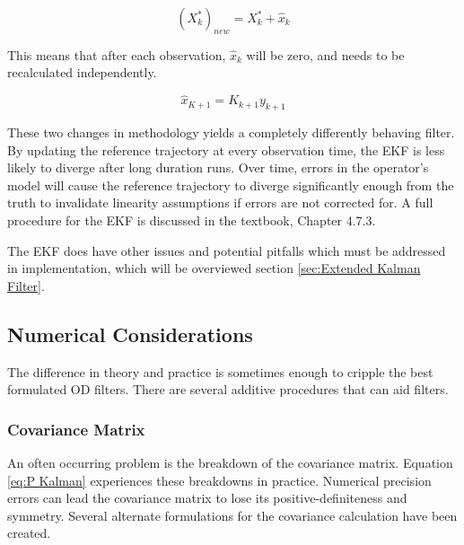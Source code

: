 \documentclass[12pt,a4paper,oneside]{article}
\numberwithin{equation}{section}   		%
\begin{document}
\begin{equation}
	(X_k^*)_{new} = X^*_k + \hat{x}_k
	\label{eq:Xk EKF}
\end{equation}

This means that after each observation, $\hat{x}_k$ will be zero, and needs to be recalculated independently. 

\begin{equation}
	\hat{x}_{K+1} = K_{k+1}y_{k+1}
	\label{eq:xk EKF}
\end{equation}

These two changes in methodology yields a completely differently behaving filter. By updating the reference trajectory at every observation time, the EKF is less likely to diverge after long duration runs. Over time, errors in the operator's model will cause the reference trajectory to diverge significantly enough from the truth to invalidate linearity assumptions if errors are not corrected for. A full procedure for the EKF is discussed in the textbook, Chapter 4.7.3. 

The EKF does have other issues and potential pitfalls which must be addressed in implementation, which will be overviewed section \ref{sec:Extended Kalman Filter}. 






\subsection{Numerical Considerations} 
\label{sec:Numerical Considerations}

The difference in theory and practice is sometimes enough to cripple the best formulated OD filters. There are several additive procedures that can aid filters.



\subsubsection{Covariance Matrix}
\label{sec:Cov Mat}
An often occurring problem is the breakdown of the covariance matrix. Equation \eqref{eq:P Kalman} experiences these breakdowns in practice. Numerical precision errors can lead the covariance matrix to lose its positive-definiteness and symmetry. Several alternate formulations for the covariance calculation have been created. 
\end{document}
